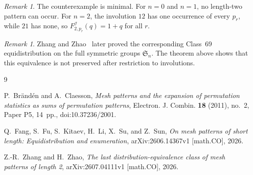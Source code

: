 \documentclass[11pt]{amsart}
\theoremstyle{remark}
\newtheorem{remark}[theorem]{Remark}
\begin{document}
\begin{remark}
The counterexample is minimal. For $n=0$ and $n=1$, no length-two
pattern can occur. For $n=2$, the involution $12$ has one occurrence
of every $p_r$, while $21$ has none, so
$F^{\mathcal I}_{2,p_r}(q)=1+q$ for all $r$.
\end{remark}

\begin{remark}
Zhang and Zhao~\cite[Theorem~1.1]{ZZ26} later proved the corresponding
Class~69 equidistribution on the full symmetric groups $\mathfrak S_n$.
The theorem above shows that this equivalence is not preserved after
restriction to involutions.
\end{remark}

\begin{thebibliography}{9}

P.~Br\"and\'en and A.~Claesson,
\emph{Mesh patterns and the expansion of permutation statistics as
sums of permutation patterns},
Electron. J. Combin. \textbf{18} (2011), no.~2, Paper P5, 14~pp.,
doi:10.37236/2001.

Q.~Fang, S.~Fu, S.~Kitaev, H.~Li, X.~Su, and Z.~Sun,
\emph{On mesh patterns of short length: Equidistribution and
enumeration},
arXiv:2606.14367v1 [math.CO], 2026.

Z.-R.~Zhang and H.~Zhao,
\emph{The last distribution-equivalence class of mesh patterns of
length 2},
arXiv:2607.04111v1 [math.CO], 2026.

\end{thebibliography}
\end{document}
